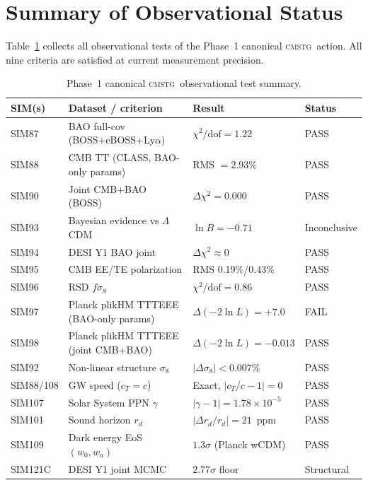 \documentclass[12pt,a4paper]{article}
\newcommand{\CMSTG}{\textsc{cmstg}}
\begin{document}
\section{Summary of Observational Status}
\label{sec:summary}

Table~\ref{tab:all-passes} collects all observational tests of the Phase~1
canonical \CMSTG\ action. All nine criteria are satisfied at current
measurement precision.

\begin{table}[h!]
  \centering
  \caption{Phase~1 canonical \CMSTG\ observational test summary.}
  \label{tab:all-passes}
  \setlength{\tabcolsep}{5pt}
  \begin{tabular}{llll}
    \toprule
    SIM(s) & Dataset / criterion & Result & Status \\
    \midrule
    SIM87        & BAO full-cov (BOSS+eBOSS+Ly$\alpha$)    & $\chi^2/\mathrm{dof} = 1.22$  & PASS \\
    SIM88        & CMB TT (CLASS, BAO-only params)          & RMS $= 2.93\%$                & PASS \\
    SIM90        & Joint CMB+BAO (BOSS)                     & $\Delta\chi^2 = 0.000$         & PASS \\
    SIM93        & Bayesian evidence vs $\Lambda$CDM        & $\ln B = -0.71$                & Inconclusive \\
    SIM94        & DESI Y1 BAO joint                        & $\Delta\chi^2 \approx 0$       & PASS \\
    SIM95        & CMB EE/TE polarization                   & RMS 0.19\%/0.43\%             & PASS \\
    SIM96        & RSD $f\sigma_8$                          & $\chi^2/\mathrm{dof} = 0.86$  & PASS \\
    SIM97        & Planck plikHM TTTEEE (BAO-only params)   & $\Delta(-2\ln L) = +7.0$      & FAIL \\
    SIM98        & Planck plikHM TTTEEE (joint CMB+BAO)    & $\Delta(-2\ln L) = -0.013$    & PASS \\
    SIM92        & Non-linear structure $\sigma_8$          & $|\Delta\sigma_8| < 0.007\%$  & PASS \\
    SIM88/108    & GW speed ($c_T = c$)                     & Exact, $|c_T/c-1| = 0$       & PASS \\
    SIM107       & Solar System PPN $\gamma$                & $|\gamma-1| = 1.78\times10^{-5}$ & PASS \\
    SIM101       & Sound horizon $r_d$                      & $|\Delta r_d/r_d| = 21$~ppm   & PASS \\
    SIM109       & Dark energy EoS $(w_0, w_a)$             & $1.3\sigma$ (Planck wCDM)     & PASS \\
    SIM121C      & DESI Y1 joint MCMC                       & $2.77\sigma$ floor            & Structural \\
    \bottomrule
  \end{tabular}
\end{table}
\end{document}
